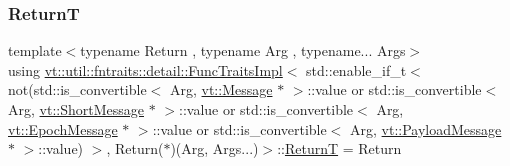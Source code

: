 \subsubsection{\texorpdfstring{ReturnT}{ReturnT}}
{\footnotesize\ttfamily template$<$typename Return , typename Arg , typename... Args$>$ \\
using \hyperlink{structvt_1_1util_1_1fntraits_1_1detail_1_1_func_traits_impl}{vt\+::util\+::fntraits\+::detail\+::\+Func\+Traits\+Impl}$<$ std\+::enable\+\_\+if\+\_\+t$<$ not(std\+::is\+\_\+convertible$<$ Arg, \hyperlink{namespacevt_a3a3ddfef40b4c90915fa43cdd5f129ea}{vt\+::\+Message} $\ast$ $>$\+::value or std\+::is\+\_\+convertible$<$ Arg, \hyperlink{namespacevt_a1125ac1da6c0bbf141e0ea0739d7602d}{vt\+::\+Short\+Message} $\ast$ $>$\+::value or std\+::is\+\_\+convertible$<$ Arg, \hyperlink{namespacevt_ad67368ffae52d7325002586b41bb150e}{vt\+::\+Epoch\+Message} $\ast$ $>$\+::value or std\+::is\+\_\+convertible$<$ Arg, \hyperlink{namespacevt_a89a92229c5622b855c02c549f83a1a68}{vt\+::\+Payload\+Message} $\ast$ $>$\+::value) $>$, Return($\ast$)(Arg, Args...)$>$\+::\hyperlink{structvt_1_1util_1_1fntraits_1_1detail_1_1_func_traits_impl_3_01std_1_1enable__if__t_3_01not_07s3fd5866f31025a6fa1e7500192630846_a585043c274d89488f8092a8a8ab27d0a}{ReturnT} =  Return}

